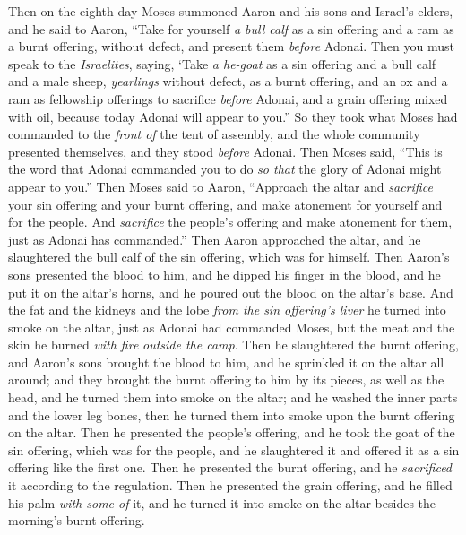 \begin{biblechapter} %
 Then on the eighth day Moses summoned Aaron and his sons and Israel’s elders,
\verse and he said to Aaron, “Take for yourself \textit{a bull calf} as a sin offering and a ram as a burnt offering, without defect, and present them \textit{before} Adonai.
\verse Then you must speak to the \textit{Israelites}, saying, ‘Take \textit{a he-goat} as a sin offering and a bull calf and a male sheep, \textit{yearlings} without defect, as a burnt offering,
\verse and an ox and a ram as fellowship offerings to sacrifice \textit{before} Adonai, and a grain offering mixed with oil, because today Adonai will appear to you.”
\verse So they took what Moses had commanded to the \textit{front of} the tent of assembly, and the whole community presented themselves, and they stood \textit{before} Adonai.
\verse Then Moses said, “This is the word that Adonai commanded you to do \textit{so that} the glory of Adonai might appear to you.”
\verse Then Moses said to Aaron, “Approach the altar and \textit{sacrifice} your sin offering and your burnt offering, and make atonement for yourself and for the people. And \textit{sacrifice} the people’s offering and make atonement for them, just as Adonai has commanded.”
\verse Then Aaron approached the altar, and he slaughtered the bull calf of the sin offering, which was for himself.
\verse Then Aaron’s sons presented the blood to him, and he dipped his finger in the blood, and he put it on the altar’s horns, and he poured out the blood on the altar’s base.
\verse And the fat and the kidneys and the lobe \textit{from the sin offering’s liver} he turned into smoke on the altar, just as Adonai had commanded Moses,
\verse but the meat and the skin he burned \textit{with fire} \textit{outside the camp}.
\verse Then he slaughtered the burnt offering, and Aaron’s sons brought the blood to him, and he sprinkled it on the altar all around;
\verse and they brought the burnt offering to him by its pieces, as well as the head, and he turned them into smoke on the altar;
\verse and he washed the inner parts and the lower leg bones, then he turned them into smoke upon the burnt offering on the altar.
\verse Then he presented the people’s offering, and he took the goat of the sin offering, which was for the people, and he slaughtered it and offered it as a sin offering like the first one.
\verse Then he presented the burnt offering, and he \textit{sacrificed} it according to the regulation.
\verse Then he presented the grain offering, and he filled his palm \textit{with some of} it, and he turned it into smoke on the altar besides the morning’s burnt offering.

\end{biblechapter}

